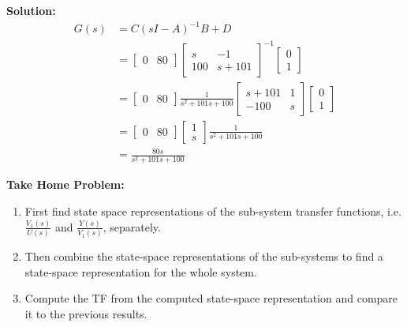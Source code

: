 \documentclass[twoside]{article}
\begin{document}
\begin{enumerate}
\textbf{Solution:}
%
\begin{align*}
G(s) &= C \left( s I - A \right)^{-1} B + D
\\
&= \left[ \begin{array}{ccc} 0 & 80  \end{array} \right]
                                 \left[ \begin{array}{cc} s & -1  \\
                                          100 & s+ 101 \end{array}
                                                \right]^{-1} \left[ \begin{array}{c} 0 \\ 1 \end{array} \right]
\\
&= \left[ \begin{array}{ccc} 0 & 80  \end{array} \right]
                                 \frac{1}{s^2+101 s + 100} 
\left[ \begin{array}{cc} s+101 & 1  \\ -100 & s \end{array} \right]
\left[ \begin{array}{c} 0 \\ 1 \end{array} \right]
\\
&= \left[ \begin{array}{ccc} 0 & 80  \end{array} \right]
\left[ \begin{array}{c} 1 \\ s \end{array} \right]
\frac{1}{s^2+101 s + 100} 
\\
&= \frac{80 s}{s^2+101 s + 100} 
\end{align*}

\end{enumerate}

\textbf{Take Home Problem:} 
\begin{enumerate}
\item First find state space representations of the
sub-system transfer functions, i.e. $\frac{V_1(s)}{U(s)}$ and
$\frac{Y(s)}{V_1(s)}$, separately.
\item Then combine the state-space
representations of the sub-systems to find a state-space representation 
for the whole system. 
\item Compute the TF from the computed state-space representation 
and compare it to the previous results.
\end{enumerate}

%

\end{document}

